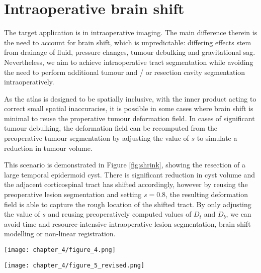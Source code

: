 \section{Intraoperative brain shift}


The target application is in intraoperative imaging.
The main difference therein is the need to account for brain shift, which is unpredictable: differing effects stem from drainage of fluid, pressure changes, tumour debulking and gravitational sag.
Nevertheless, we aim to achieve intraoperative tract segmentation while avoiding the need to perform additional tumour and / or resection cavity segmentation intraoperatively.

As the atlas is designed to be spatially inclusive, with the inner product acting to correct small spatial inaccuracies, it is possible in some cases where brain shift is minimal to reuse the properative tumour deformation field.
In cases of significant tumour debulking, the deformation field can be recomputed from the preoperative tumour segmentation by adjusting the value of $s$ to simulate a reduction in tumour volume.

This scenario is demonstrated in Figure \ref{fig:shrink}, showing the resection of a large temporal epidermoid cyst. There is significant reduction in cyst volume and the adjacent corticospinal tract has shifted accordingly, however by reusing the preoperative lesion segmentation and setting $s=0.8$, the resulting deformation field is able to capture the rough location of the shifted tract. By only adjusting the value of $s$ and reusing preoperatively computed values of $D_t$ and $D_b$, we can avoid time and resource-intensive intraoperative lesion segmentation, brain shift modelling or non-linear registration.

\begin{figure*}[h!]
  \centering
  \texttt{[image: chapter\_4/figure\_4.png]}
  \caption{Example results in intraoperative image using scaled preoperative tumour segmentation. Blue outline: Tumour segmentation. Green outline: effective tumour boundary with $s=0.8$ used for intraoperative segmentation}
  \label{fig:shrink}
\end{figure*}

\begin{figure*}[h!]
  \centering
  \texttt{[image: chapter\_4/figure\_5\_revised.png]}
  \caption{Sample results in 4 different clinical subjects. First column: linearly registered tract atlas (spatial component only). Second column: atlas after tumour deformation. Third column: Final tract map. Fourth column: Track density image from streamline tractography, where intensity corresponds to streamline count per $(2.5mm)^3$ voxel (thresholded at 10 streamlines).}
  \label{fig:res}
\end{figure*}

